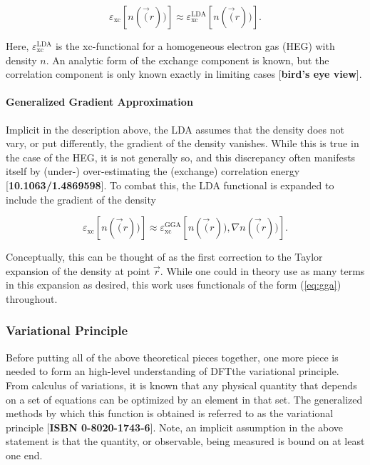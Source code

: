         \begin{equation}
            \varepsilon_\text{xc}[n(\vec(r))] \approx \varepsilon_\text{xc}^\text{LDA}[n(\vec(r))].
        \end{equation}
        
        \noindent Here, $\varepsilon_\text{xc}^\text{LDA}$ is the xc-functional for a homogeneous electron gas (HEG) with density $n$. An analytic form of the exchange component is known, but the correlation component is only known exactly in limiting cases [\textbf{bird's eye view}]. 
        
        \paragraph{Generalized Gradient Approximation} Implicit in the description above, the LDA assumes that the density does not vary, or put differently, the gradient of the density vanishes. While this is true in the case of the HEG, it is not generally so, and this discrepancy often manifests itself by (under-) over-estimating the (exchange) correlation energy [\textbf{10.1063/1.4869598}]. To combat this, the LDA functional is expanded to include the gradient of the density 
        
        \begin{equation}
        \label{eq:gga}
            \varepsilon_\text{xc}[n(\vec(r))] \approx \varepsilon_\text{xc}^\text{GGA}[n(\vec(r)),\nabla n(\vec(r))].
        \end{equation}
        
        \noindent Conceptually, this can be thought of as the first correction to the Taylor expansion of the density at point $\vec{r}$. While one could in theory use as many terms in this expansion as desired, this work uses functionals of the form (\ref{eq:gga}) throughout.
        
        \subsubsection{Variational Principle}
        
        Before putting all of the above theoretical pieces together, one more piece is needed to form an high-level understanding of DFT\textemdash the variational principle. From calculus of variations, it is known that any physical quantity that depends on a set of equations can be optimized by an element in that set. The generalized methods by which this function is obtained is referred to as the variational principle [\textbf{ISBN 0-8020-1743-6}]. Note, an implicit assumption in the above statement is that the quantity, or observable, being measured is bound on at least one end.
        
